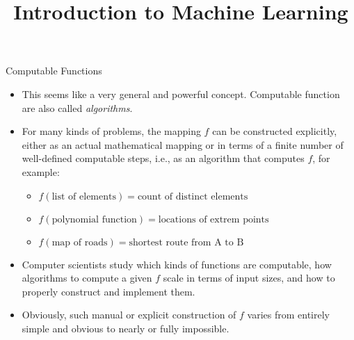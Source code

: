 \documentclass[11pt,compress,t,notes=noshow, xcolor=table]{beamer}
\title{Introduction to Machine Learning}
\begin{document}

\begin{vbframe}{Computable Functions}

\begin{itemize}
\item This seems like a very general and powerful concept. 
  Computable function are also called \emph{algorithms}.
\item For many kinds of problems, the mapping $f$ can be constructed explicitly, either as an actual mathematical mapping or in terms of a finite number of well-defined computable steps, i.e.,  as an algorithm that computes $f$, for example:
\begin{itemize}
\item $f(\textrm{list of elements}) = \textrm{count of distinct elements}$
\item $f(\textrm{polynomial function}) = \textrm{locations of extrem points}$
\item $f(\textrm{map of roads}) = \textrm{shortest route from A to B}$
\end{itemize}
\item Computer scientists study which kinds of functions are computable, how algorithms to compute a given $f$ scale in terms of input sizes, and how to properly construct and implement them.
\item Obviously, such manual or explicit construction of $f$ varies from entirely simple and obvious to nearly or fully impossible.
\end{itemize}
\end{vbframe}

\endlecture
\end{document}
